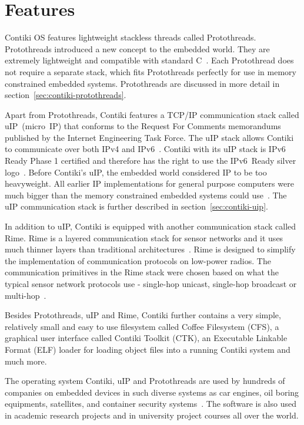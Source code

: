 
\section{Features}
Contiki OS features lightweight stackless threads called Protothreads.
Protothreads introduced a new concept to the embedded world.
They are extremely lightweight and compatible with standard C~\cite{paper-protothreads}.
Each Protothread does not require a separate stack, which fits Protothreads perfectly
for use in memory constrained embedded systems.
Protothreads are discussed in more detail in section~\ref{sec:contiki-protothreads}.

Apart from Protothreads, Contiki features a TCP/IP communication stack called uIP~(micro~IP)
that conforms to the Request For Comments memorandums published by the Internet Engineering Task Force.
The uIP stack allows Contiki to communicate over both IPv4 and IPv6~\cite{contiki-docs}.
Contiki with its uIP stack is IPv6 Ready Phase 1 certified
and therefore has the right to use the IPv6~Ready silver logo~\cite{ipv6ready-db}.
Before Contiki's uIP, the embedded world considered IP to be too heavyweight.
All earlier IP implementations for general purpose computers %
were much bigger than the memory constrained embedded systems could use~\cite{interconnecting}.
The uIP communication stack is further described in section~\ref{sec:contiki-uip}.

In addition to uIP, Contiki is equipped with another communication stack called Rime.
Rime is a layered communication stack for sensor networks and it uses
much thinner layers than traditional architectures~\cite{paper-rime}.
Rime is designed to simplify the implementation of communication
protocols on low-power radios.
The communication primitives in the Rime stack were chosen
based on what the typical sensor network protocols use - %
single-hop unicast, single-hop broadcast or multi-hop~\cite{contiki-docs,paper-rime}.

Besides Protothreads, uIP and Rime,
Contiki further contains a very simple, relatively small and easy to use filesystem
called Coffee Filesystem (CFS),
a graphical user interface called Contiki Toolkit (CTK), an
Executable Linkable Format (ELF) loader for loading object files into a running Contiki system
and much more.

The operating system Contiki, uIP and Protothreads are used by hundreds of companies on embedded devices in %
such diverse systems as car engines, oil boring equipments, satellites, and container security systems~\cite{thesis-programming}.
The software is also used in academic research
projects and in university project courses all over the world.

